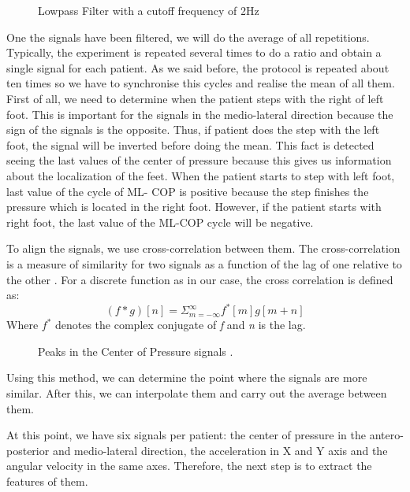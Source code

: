 \begin{figure}[H]
	\centering
	\caption{Lowpass Filter with a cutoff frequency of 2Hz}
	\label{fig:lowpassFilter}
\end{figure} 

One the signals have been filtered, we will do the average of all repetitions. Typically, the experiment is repeated several times to do a ratio and obtain a single signal for each patient. As we said before, the protocol is repeated about ten times so we have to synchronise this cycles and realise the mean of all them.  First of all, we need to determine when the patient steps with the right of left foot. This is important for the signals in the medio-lateral direction because the sign of the signals is the opposite. Thus, if patient does the step with the left foot, the signal will be inverted before doing the mean. This fact is detected seeing the last values of the center of pressure because this gives us information about the localization of the feet.
When the patient starts to step with left foot, last value of the cycle of ML- COP is positive because the step finishes the pressure which is located in the right foot. However, if the patient starts with right foot, the last value of the ML-COP cycle will be negative.

To align the signals, we use cross-correlation between them. The cross-correlation is a measure of similarity for two signals as a function of the lag of one relative to the other \cite{Cross-corr}. For a discrete function as in our case, the cross correlation is defined as:
\begin{equation}
\label{cross-corr}
(f*g)[n]=\varSigma_{m=-\infty}^{\infty} f^{*}[m]g[m+n]
\end{equation}
Where $ f^{*}$ denotes the complex conjugate of \textit{f} and \textit{n} is the lag.



\begin{figure}[H]
	\centering
	\caption{Peaks in the Center of Pressure signals .}
	\label{fig:COP_features}
\end{figure}

Using this method, we can determine the point where the signals are more similar. After this, we can interpolate them and carry out the average between them.

At this point, we have six signals per patient: the center of pressure in the antero-posterior and medio-lateral direction, the acceleration in X and Y axis and the angular velocity in the same axes. Therefore, the next step is to extract the features of them. 

